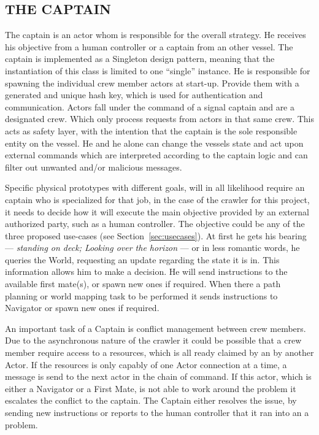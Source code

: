 \subsection{THE CAPTAIN}\label{seq:the captain}

The captain is an actor whom is responsible for the overall strategy. He receives his objective from a human controller
or a captain from an other vessel. The captain is implemented as a Singleton design pattern, meaning that the
instantiation of this class is limited to one ``single'' instance. He is responsible for spawning the individual crew
member actors at start-up. Provide them with a generated and unique hash key, which is used for authentication and
communication. Actors fall under the command of a signal captain and are a designated crew. Which only process requests
from actors in that same crew. This acts as safety layer, with the intention that the captain is the sole responsible
entity on the vessel. He and he alone can change the vessels state and act upon external commands which are interpreted
according to the captain logic and can filter out unwanted and/or malicious messages.

Specific physical prototypes with different goals, will in all likelihood require an captain who is specialized for that
job, in the case of the crawler for this project, it needs to decide how it will execute the main objective provided by
an external authorized party, such as a human controller. The objective could be any of the three proposed use-cases
(see Section~\ref{sec:usecases}). At first he gets his bearing --- \textit{standing on deck; Looking over the horizon}
--- or in less romantic words, he queries the World, requesting an update regarding the state it is in. This information
allows him to make a decision. He will send instructions to the available first mate(s), or spawn new ones if required.
When there a path planning or world mapping task to be performed it sends instructions to Navigator or spawn new ones
if required.

An important task of a Captain is conflict management between crew members. Due to the asynchronous nature of the
crawler it could be possible that a crew member require access to a resources, which is all ready claimed by an by
another Actor. If the resources is only capably of one Actor connection at a time, a message is send to the next actor
in the chain of command. If this actor, which is either a Navigator or a First Mate, is not able to work around the
problem it escalates the conflict to the captain. The Captain either resolves the issue, by sending new instructions or
reports to the human controller that it ran into an a problem.

